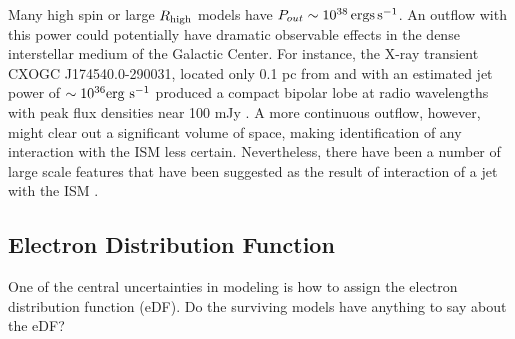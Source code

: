 Many high spin or large $R_\mathrm{high}$ models have $P_{out} \sim 10^{38} \,\mathrm{ergs\,s^{-1}}$.
An outflow with this power could potentially have dramatic observable effects in the dense interstellar medium of the Galactic Center.  For instance, the X-ray transient CXOGC J174540.0-290031, located only 0.1 pc from \sgra and with an estimated jet power of $\sim 10^{36} {\rm erg\ s^{-1}}$ produced a compact bipolar lobe at radio wavelengths with peak flux densities near 100  mJy  \citep{2005ApJ...633..218B}.  A more continuous  outflow, however, might clear out a significant volume of space, making identification of any interaction with the ISM less certain.  Nevertheless, there have been a number of large scale features that have been suggested as the result of interaction of a jet with the ISM \citep[e.g.]{2013ApJ...779..154L, 2021ApJ...922..254C}.


\subsection{Electron Distribution Function}

One of the central uncertainties in modeling \sgra is how to assign the electron distribution function (eDF).  Do the surviving models have anything to say about the eDF?

